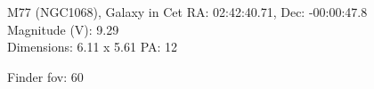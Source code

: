 \begin{block}{M77 (NGC1068), Galaxy in Cet}
    RA: 02:42:40.71, Dec: -00:00:47.8 \\ 
    Magnitude (V): 9.29 \\ 
    Dimensions: 6.11 x 5.61 PA: 12 

    Finder fov: 60 
\end{block}